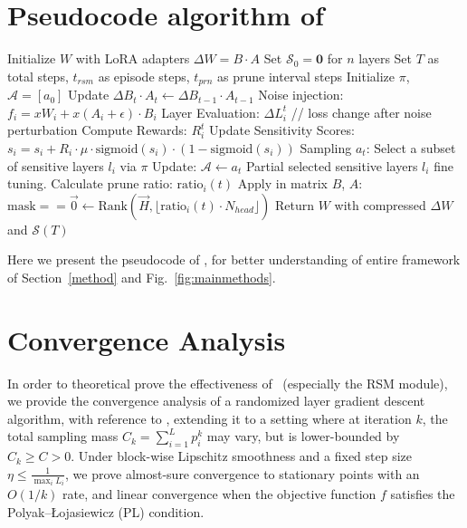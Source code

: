 \section{Pseudocode algorithm of \method}
\label{apd:algorithm}
\begin{algorithm}[h]
\caption{\method: RL-based Sensitivity Measurement \& Shielded Adapter Compression}
\label{alg:method}
\begin{algorithmic}[1]
\State Initialize $W$ with LoRA adapters $\Delta W = B \cdot A$
\State Set $\mathcal{S}_0 = \textbf{0}$ for $n$ layers
\State Set $T$ as total steps, $t_{rsm}$ as episode steps, $t_{prn}$ as prune interval steps
\State Initialize $\pi$, $\mathcal{A} = [a_0]$
    \State Update $\Delta B_t \cdot A_{t} \leftarrow \Delta B_{t-1} \cdot A_{t-1}$
            \State Noise injection: $f_i = xW_i+x(A_i+\epsilon) \cdot B_i$
            \State Layer Evaluation: $\Delta L_i^t$    \quad \quad \quad   // loss change after noise perturbation
            \State Compute Rewards:  $R_i^t$            \quad \quad \quad  
            \State Update Sensitivity Scores: $s_i = s_i + R_i \cdot \mu \cdot \text{sigmoid}(s_i) \cdot (1 - \text{sigmoid}(s_i))$
        \EndFor
        \State Sampling $a_t$: Select a subset of sensitive layers $l_i$ via $\pi$
        \State Update: $\mathcal{A} \leftarrow a_t$ 
        \State Partial selected sensitive layers $l_i$ fine tuning.
    \EndIf
            \State Calculate prune ratio: $\text{ratio}_i(t)$
            \State Apply in matrix $B$, $A$: $\text{mask} == \vec{0} \gets \text{Rank}(\vec{H}, \lfloor \text{ratio}_i(t) \cdot N_{head} \rfloor)$
        \EndFor
    \EndIf
\EndFor
\State Return $W$ with compressed $\Delta W$ and $\mathcal{S}(T)$
\end{algorithmic}
\end{algorithm}
Here we present the pseudocode of \method, for better understanding of entire framework of Section~\ref{method} and Fig.~\ref{fig:mainmethods}.

\section{Convergence Analysis}
\label{convergence_analysis}
In order to theoretical prove the effectiveness of \method~(especially the RSM module), we provide the convergence analysis of a randomized layer gradient descent algorithm, with reference to \cite{nesterov2012efficiency}, extending it to a setting where at iteration \(k\), the total sampling mass \(C_k = \sum_{i=1}^L p_i^k\) may vary, but is lower-bounded by \(C_k \ge C > 0\). Under block-wise Lipschitz smoothness and a fixed step size \(\eta \le \frac{1}{\max_i L_i}\), we prove almost-sure convergence to stationary points with an \(O(1/k)\) rate, and linear convergence when the objective function \(f\) satisfies the Polyak–Łojasiewicz (PL) condition.

